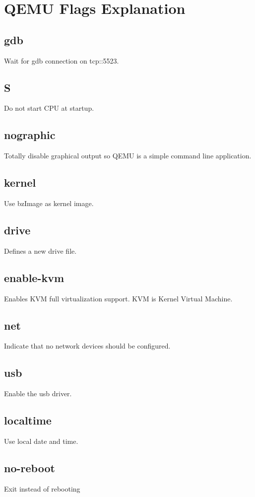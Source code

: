 \documentclass[10pt,letterpaper,onecolumn,draftclsnofoot]{IEEEtran}
\begin{document}
\section{QEMU Flags Explanation}
\subsection{gdb}
Wait for gdb connection on tcp::5523.

\subsection{S}
Do not start CPU at startup.

\subsection{nographic}
Totally disable graphical output so QEMU is a simple command line application.

\subsection{kernel}
Use bzImage as kernel image.

\subsection{drive}
Defines a new drive file.

\subsection{enable-kvm}
Enables KVM full virtualization support. KVM is Kernel Virtual Machine.

\subsection{net}
Indicate that no network devices should be configured.

\subsection{usb}
Enable the usb driver.

\subsection{localtime}
Use local date and time.

\subsection{no-reboot}
Exit instead of rebooting
\end{document}
